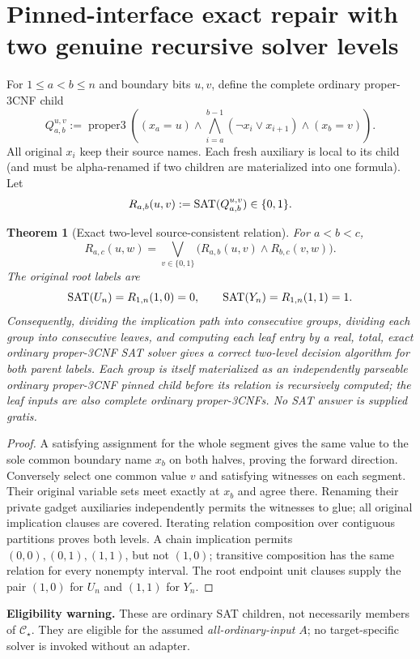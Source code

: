 \documentclass[11pt]{article}
\newtheorem{theorem}{Theorem}
\newcommand{\SAT}{\mathop{\rm SAT}}
\begin{document}
\section{Pinned-interface exact repair with two genuine recursive solver levels}
For $1\le a<b\le n$ and boundary bits $u,v$, define the complete ordinary proper-3CNF child
\[
Q_{a,b}^{u,v}:=\operatorname{proper3}\left(
 (x_a=u)\wedge\bigwedge_{i=a}^{b-1}(\neg x_i\vee x_{i+1})
 \wedge(x_b=v)\right).
\]
All original $x_i$ keep their source names. Each fresh auxiliary is local to its child (and must be alpha-renamed if two children are materialized into one formula). Let
\[
R_{a,b}(u,v):=\SAT(Q_{a,b}^{u,v})\in\{0,1\}.
\]
\begin{theorem}[Exact two-level source-consistent relation]
For $a<b<c$,
\[
R_{a,c}(u,w)=\bigvee_{v\in\{0,1\}}
 \bigl(R_{a,b}(u,v)\wedge R_{b,c}(v,w)\bigr).
\]
The original root labels are
\[
\SAT(U_n)=R_{1,n}(1,0)=0,\qquad
\SAT(Y_n)=R_{1,n}(1,1)=1.
\]
Consequently, dividing the implication path into consecutive groups, dividing each group into consecutive leaves, and computing each leaf entry by a \emph{real, total, exact ordinary proper-3CNF SAT solver} gives a correct two-level decision algorithm for both parent labels. Each group is itself materialized as an independently parseable ordinary proper-3CNF pinned child before its relation is recursively computed; the leaf inputs are also complete ordinary proper-3CNFs. No SAT answer is supplied gratis.
\end{theorem}
\begin{proof}
A satisfying assignment for the whole segment gives the same value to the sole common boundary name $x_b$ on both halves, proving the forward direction. Conversely select one common value $v$ and satisfying witnesses on each segment. Their original variable sets meet exactly at $x_b$ and agree there. Renaming their private gadget auxiliaries independently permits the witnesses to glue; all original implication clauses are covered. Iterating relation composition over contiguous partitions proves both levels. A chain implication permits $(0,0),(0,1),(1,1)$, but not $(1,0)$; transitive composition has the same relation for every nonempty interval. The root endpoint unit clauses supply the pair $(1,0)$ for $U_n$ and $(1,1)$ for $Y_n$.
\end{proof}
\noindent\textbf{Eligibility warning.} These are ordinary SAT children, not necessarily members of $\mathcal C_\star$. They are eligible for the assumed \emph{all-ordinary-input} $A$; no target-specific solver is invoked without an adapter.
\end{document}
